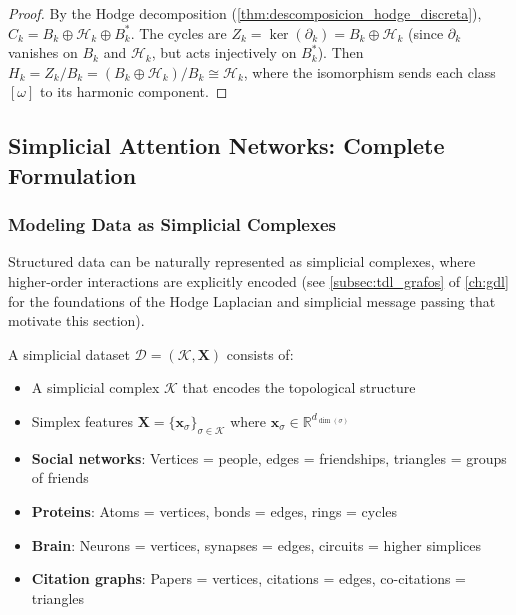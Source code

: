 \begin{proof}
By the Hodge decomposition (\autoref{thm:descomposicion_hodge_discreta}), $C_k = B_k \oplus \mathcal{H}_k \oplus B_k^*$. The cycles are $Z_k = \ker(\partial_k) = B_k \oplus \mathcal{H}_k$ (since $\partial_k$ vanishes on $B_k$ and $\mathcal{H}_k$, but acts injectively on $B_k^*$). Then $H_k = Z_k / B_k = (B_k \oplus \mathcal{H}_k) / B_k \cong \mathcal{H}_k$, where the isomorphism sends each class $[\omega]$ to its harmonic component.
\end{proof}

\subsection{Simplicial Attention Networks: Complete Formulation}

\subsubsection{Modeling Data as Simplicial Complexes}

Structured data can be naturally represented as simplicial complexes, where higher-order interactions are explicitly encoded (see \autoref{subsec:tdl_grafos} of \autoref{ch:gdl} for the foundations of the Hodge Laplacian and simplicial message passing that motivate this section).

\begin{definition}\label{def:dataset_simplicial}
A simplicial dataset $\mathcal{D} = (\mathcal{K}, \mathbf{X})$ consists of:
\begin{itemize}
    \item A simplicial complex $\mathcal{K}$ that encodes the topological structure
    \item Simplex features $\mathbf{X} = \{\mathbf{x}_{\sigma}\}_{\sigma \in \mathcal{K}}$ where $\mathbf{x}_{\sigma} \in \mathbb{R}^{d_{\dim(\sigma)}}$
\end{itemize}
\end{definition}

\begin{example}\label{ex:aplicaciones_datasets_simpliciales}
\leavevmode
\begin{itemize}
    \item \textbf{Social networks}: Vertices = people, edges = friendships, triangles = groups of friends
    \item \textbf{Proteins}: Atoms = vertices, bonds = edges, rings = cycles
    \item \textbf{Brain}: Neurons = vertices, synapses = edges, circuits = higher simplices
    \item \textbf{Citation graphs}: Papers = vertices, citations = edges, co-citations = triangles
\end{itemize}
\end{example}

